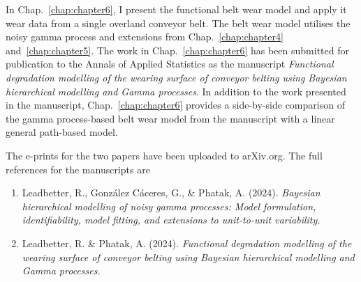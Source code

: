 \documentclass[apa,colorlinks,emptypage]{curtinThesis}
\begin{document}
In Chap.~\ref{chap:chapter6}, I present the functional belt wear model and apply it wear data from a single overland conveyor belt. The belt wear model utilises the noisy gamma process and extensions from Chap.~\ref{chap:chapter4} and~\ref{chap:chapter5}. The work in Chap.~\ref{chap:chapter6} has been submitted for publication to the Annals of Applied Statistics as the manuscript \textit{Functional degradation modelling of the wearing surface of conveyor belting using Bayesian hierarchical modelling and Gamma processes}. In addition to the work presented in the manuscript, Chap.~\ref{chap:chapter6} provides a side-by-side comparison of the gamma process-based belt wear model from the manuscript with a linear general path-based model.

The e-prints for the two papers have been uploaded to arXiv.org. The full references for the manuscripts are
\begin{enumerate}
  \item Leadbetter, R., Gonz\'{a}lez C\'{a}ceres, G., \& Phatak, A. (2024). \textit{Bayesian hierarchical modelling of noisy gamma processes: Model formulation, identifiability, model fitting, and extensions to unit-to-unit variability.}
  \item Leadbetter, R. \& Phatak, A. (2024). \textit{Functional degradation modelling of the wearing surface of conveyor belting using Bayesian hierarchical modelling and Gamma processes.}
\end{enumerate}







\begin{customappendix}{} %



\end{customappendix}

\backmatter{}

\ackstatement %
\end{document}
